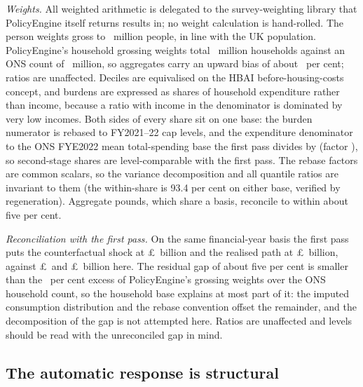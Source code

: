 \emph{Weights.} All weighted arithmetic is delegated to the
survey-weighting library that PolicyEngine itself returns results in;
no weight calculation is hand-rolled. The person
weights gross to \SsPersonsM\ million people, in line with the UK
population. PolicyEngine's household grossing weights total
\SsWeightedHouseholdsM\ million households against an ONS count of
\SsOnsHouseholdsM\ million, so aggregates carry an upward bias of about
\SsWeightExcessPct\ per cent; ratios are unaffected. Deciles are
equivalised on the HBAI before-housing-costs concept, and burdens are
expressed as shares of household expenditure rather than income,
because a ratio with income in the denominator is dominated by
very low incomes. Both sides of every share sit on one base: the burden numerator is
rebased to FY2021--22 cap levels, and the expenditure denominator to
the ONS FYE2022 mean total-spending base the first pass divides by
(factor \SsSpendRebase), so second-stage shares are level-comparable
with the first pass. The rebase factors are common scalars, so the variance decomposition
and all quantile ratios are invariant to them (the within-share is
93.4 per cent on either base, verified by regeneration). Aggregate pounds, which share a basis, reconcile to
within about five per cent.

\emph{Reconciliation with the first pass.} On the same
financial-year basis the first pass puts the counterfactual shock at
\pounds\MsEnergyGrossAggBn\ billion and the realised path at
\pounds\MsEnergyRealisedAggBn\ billion, against
\pounds\SsCounterAggBn\ and \pounds\SsRealisedAggBn\ billion here. The
residual gap of about five per cent is smaller than the
\SsWeightExcessPct\ per cent excess of PolicyEngine's grossing weights
over the ONS household count, so the household base explains at most
part of it: the imputed consumption distribution and the rebase
convention offset the remainder, and the decomposition of the gap is
not attempted here. Ratios are unaffected and levels should be read
with the unreconciled gap in mind.

\subsection{The automatic response is structural}

